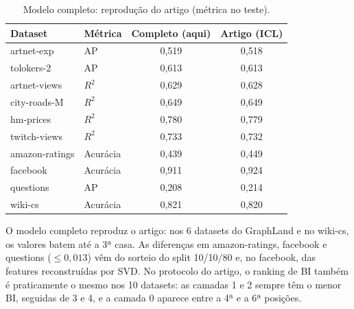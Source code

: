 \documentclass[12pt,a4paper]{article}
\begin{document}
\begin{table}[H]
\centering
\caption{Modelo completo: reprodução do artigo (métrica no teste).}
\label{tab:gpfn-reproducao}
\begin{tabular}{@{}llcc@{}}
\toprule
Dataset & Métrica & Completo (aqui) & Artigo (ICL) \\
\midrule
artnet-exp     & AP       & 0,519 & 0,518 \\
tolokers-2     & AP       & 0,613 & 0,613 \\
artnet-views   & $R^2$    & 0,629 & 0,628 \\
city-roads-M   & $R^2$    & 0,649 & 0,649 \\
hm-prices      & $R^2$    & 0,780 & 0,779 \\
twitch-views   & $R^2$    & 0,733 & 0,732 \\
amazon-ratings & Acurácia & 0,439 & 0,449 \\
facebook       & Acurácia & 0,911 & 0,924 \\
questions      & AP       & 0,208 & 0,214 \\
wiki-cs        & Acurácia & 0,821 & 0,820 \\
\bottomrule
\end{tabular}
\end{table}

O modelo completo reproduz o artigo: nos 6 datasets do GraphLand e no wiki-cs, os valores batem até a 3ª casa. As diferenças em amazon-ratings, facebook e questions ($\leq 0{,}013$) vêm do sorteio do split 10/10/80 e, no facebook, das features reconstruídas por SVD. No protocolo do artigo, o ranking de BI também é praticamente o mesmo nos 10 datasets: as camadas 1 e 2 sempre têm o menor BI, seguidas de 3 e 4, e a camada 0 aparece entre a 4ª e a 6ª posições.
\end{document}
